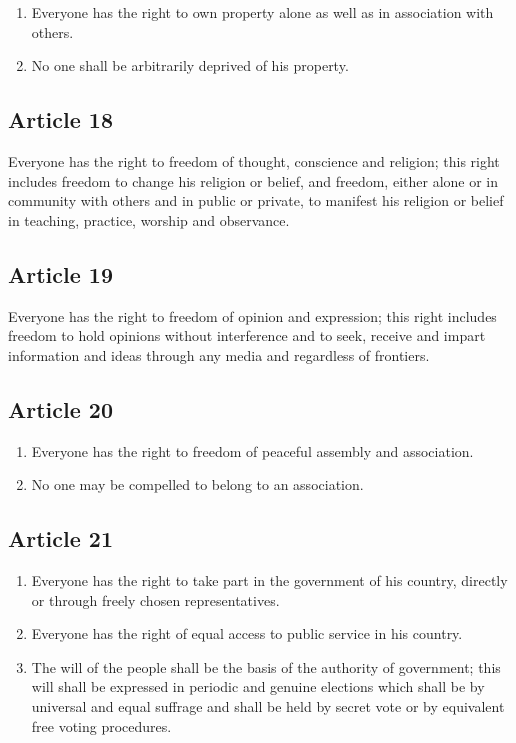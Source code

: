 \documentclass[
  titlepage,
  openright,
  DIV=calc,
  toc=listof,
  listof=nochaptergap]{scrbook}
\begin{document}
\begin{enumerate}
\def\labelenumi{\arabic{enumi}.}
\item
  Everyone has the right to own property alone as well as in association
  with others.
\item
  No one shall be arbitrarily deprived of his property.
\end{enumerate}

\hypertarget{article-18-1}{%
\subsection{Article 18}\label{article-18-1}}

Everyone has the right to freedom of thought, conscience and religion;
this right includes freedom to change his religion or belief, and
freedom, either alone or in community with others and in public or
private, to manifest his religion or belief in teaching, practice,
worship and observance.

\hypertarget{article-19-1}{%
\subsection{Article 19}\label{article-19-1}}

Everyone has the right to freedom of opinion and expression; this right
includes freedom to hold opinions without interference and to seek,
receive and impart information and ideas through any media and
regardless of frontiers.

\hypertarget{article-20-1}{%
\subsection{Article 20}\label{article-20-1}}

\begin{enumerate}
\def\labelenumi{\arabic{enumi}.}
\item
  Everyone has the right to freedom of peaceful assembly and
  association.
\item
  No one may be compelled to belong to an association.
\end{enumerate}

\hypertarget{article-21-1}{%
\subsection{Article 21}\label{article-21-1}}

\begin{enumerate}
\def\labelenumi{\arabic{enumi}.}
\item
  Everyone has the right to take part in the government of his country,
  directly or through freely chosen representatives.
\item
  Everyone has the right of equal access to public service in his
  country.
\item
  The will of the people shall be the basis of the authority of
  government; this will shall be expressed in periodic and genuine
  elections which shall be by universal and equal suffrage and shall be
  held by secret vote or by equivalent free voting procedures.
\end{enumerate}
\end{document}
